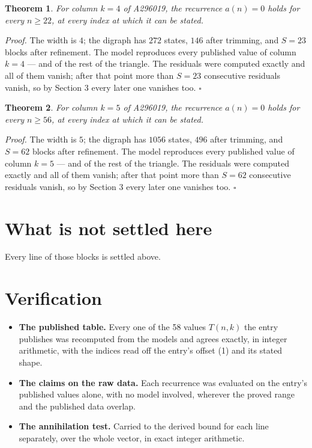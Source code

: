 \documentclass[11pt]{article}
\newtheorem{theorem}{Theorem}
\theoremstyle{definition}
\begin{document}
\begin{theorem} For column $k = 4$ of A296019, the recurrence $a(n) = 0$ holds for every $n \ge 22$, at every index at which it can be stated.\end{theorem}

{\itshape Proof.} The width is $4$; the digraph has $272$ states, $146$ after trimming, and $S = 23$ blocks after refinement. The model reproduces every published value of column $k = 4$ --- and of the rest of the triangle. The residuals were computed exactly and all of them vanish; after that point more than $S = 23$ consecutive residuals vanish, so by Section 3 every later one vanishes too. $\square$

\begin{theorem} For column $k = 5$ of A296019, the recurrence $a(n) = 0$ holds for every $n \ge 56$, at every index at which it can be stated.\end{theorem}

{\itshape Proof.} The width is $5$; the digraph has $1056$ states, $496$ after trimming, and $S = 62$ blocks after refinement. The model reproduces every published value of column $k = 5$ --- and of the rest of the triangle. The residuals were computed exactly and all of them vanish; after that point more than $S = 62$ consecutive residuals vanish, so by Section 3 every later one vanishes too. $\square$

\section{What is not settled here}

Every line of those blocks is settled above.

\section{Verification}

\begin{itemize}

\item {\bfseries The published table.} Every one of the 58 values $T(n,k)$ the entry publishes was recomputed from the models and agrees exactly, in integer arithmetic, with the indices read off the entry's offset (1) and its stated shape.

\item {\bfseries The claims on the raw data.} Each recurrence was evaluated on the entry's published values alone, with no model involved, wherever the proved range and the published data overlap.

\item {\bfseries The annihilation test.} Carried to the derived bound for each line separately, over the whole vector, in exact integer arithmetic.

\end{itemize}
\end{document}
